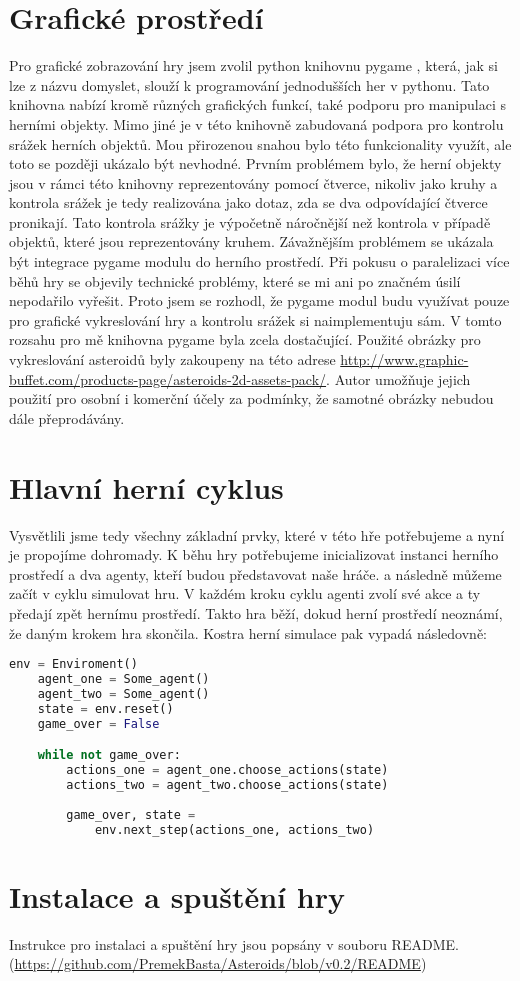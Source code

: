 \section{Grafické prostředí}
Pro grafické zobrazování hry jsem zvolil python knihovnu pygame \cite{pygame}, která, jak si lze z názvu domyslet, slouží k programování jednodušších her v pythonu.
Tato knihovna nabízí kromě různých grafických funkcí, také podporu pro manipulaci s herními objekty. Mimo jiné je v této knihovně zabudovaná podpora pro kontrolu srážek herních objektů.
Mou přirozenou snahou bylo této funkcionality využít, ale toto se později ukázalo být nevhodné.
Prvním problémem bylo, že herní objekty jsou v rámci této knihovny reprezentovány pomocí čtverce, nikoliv jako kruhy a kontrola srážek je tedy realizována jako dotaz, zda se dva odpovídající čtverce pronikají.
Tato kontrola srážky je výpočetně náročnější než kontrola v případě objektů, které jsou reprezentovány kruhem.  
Závažnějším problémem se ukázala být integrace pygame modulu do herního prostředí. Při pokusu o paralelizaci více běhů hry se objevily technické problémy, které se mi ani po značném úsilí nepodařilo vyřešit.
Proto jsem se rozhodl, že pygame modul budu využívat pouze pro grafické vykreslování hry a kontrolu srážek si naimplementuju sám.
V tomto rozsahu pro mě knihovna pygame byla zcela dostačující. 
Použité obrázky pro vykreslování asteroidů byly zakoupeny na této adrese \url{http://www.graphic-buffet.com/products-page/asteroids-2d-assets-pack/}.
Autor umožňuje jejich použití pro osobní i komerční účely za podmínky, že samotné obrázky nebudou dále přeprodávány.




\section{Hlavní herní cyklus}
Vysvětlili jsme tedy všechny základní prvky, které v této hře potřebujeme a nyní je propojíme dohromady.
K běhu hry potřebujeme inicializovat instanci herního prostředí a dva agenty, kteří budou představovat naše hráče.
a následně můžeme začít v cyklu simulovat hru.
V každém kroku cyklu agenti zvolí své akce a ty předají zpět hernímu prostředí.
Takto hra běží, dokud herní prostředí neoznámí, že daným krokem hra skončila.
Kostra herní simulace pak vypadá následovně:

\begin{lstlisting}[language=Python]
    env = Enviroment()
    agent_one = Some_agent()
    agent_two = Some_agent()    
    state = env.reset()
    game_over = False

    while not game_over:
        actions_one = agent_one.choose_actions(state)    
        actions_two = agent_two.choose_actions(state)
        
        game_over, state = 
            env.next_step(actions_one, actions_two)
\end{lstlisting}


\section{Instalace a spuštění hry}
Instrukce pro instalaci a spuštění hry jsou popsány v souboru README. (\url{https://github.com/PremekBasta/Asteroids/blob/v0.2/README})

